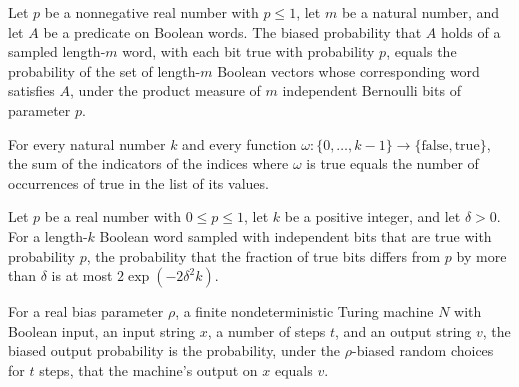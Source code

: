 \begin{theorem}
\label{Randomized.biasedProb_eq_toReal_iidBernoulli}
\leanok
{}
Let $p$ be a nonnegative real number with $p\le1$, let $m$ be a natural number, and let
$A$ be a predicate on Boolean words. The biased probability that $A$ holds of a sampled
length-$m$ word, with each bit true with probability $p$, equals the probability of the
set of length-$m$ Boolean vectors whose corresponding word satisfies $A$, under the
product measure of $m$ independent Bernoulli bits of parameter $p$.
\end{theorem}

\begin{theorem}
\label{Randomized.successCount_eq_count}
\leanok
{}
For every natural number $k$ and every function
$\omega:\{0,\ldots,k-1\}\to\{\mathrm{false},\mathrm{true}\}$, the sum of the indicators
of the indices where $\omega$ is true equals the number of occurrences of true in the
list of its values.
\end{theorem}

\begin{theorem}
\label{Randomized.biasedProb_count_dev_le}
\leanok
{}
Let $p$ be a real number with $0\le p\le1$, let $k$ be a positive integer, and let
$\delta>0$. For a length-$k$ Boolean word sampled with independent bits that are true
with probability $p$, the probability that the fraction of true bits differs from $p$ by
more than $\delta$ is at most $2\exp(-2\delta^2 k)$.
\end{theorem}

\begin{definition}
\label{Turing.FinNDTM.biasedOutputProb}
\leanok
{}
For a real bias parameter $\rho$, a finite nondeterministic Turing machine $N$ with
Boolean input, an input string $x$, a number of steps $t$, and an output string $v$, the
biased output probability is the probability, under the $\rho$-biased random choices for
$t$ steps, that the machine's output on $x$ equals $v$.
\end{definition}

